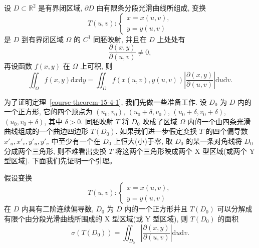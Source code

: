 \documentclass[UTF8,12pt,a4paper,fontset=fandol]{ctexart}
\begin{document}
\begin{theorem}\label{course-theorem-15-4-1}\quad 设 $D\subset\mathbb R^2$ 是有界闭区域, $\partial D$ 由有限条分段光滑曲线所组成, 变换
\[
  T(u,v):
  \begin{cases}
    x=x(u,v),\\
    y=y(u,v)
  \end{cases}
\]
是 $D$ 到有界闭区域 $\Omega$ 的 $C^1$ 同胚映射, 并且在 $D$ 上处处有
\[
  \frac{\partial(x,y)}{\partial(u,v)}\ne0,
\]
再设函数 $f(x,y)$ 在 $\Omega$ 上可积, 则
\[
  \iint_\Omega f(x,y)\mathrm dx\mathrm dy
  =\iint_D f(x(u,v),y(u,v))
  \left|\frac{\partial(x,y)}{\partial(u,v)}\right|\mathrm du\mathrm dv.
\]

为了证明定理~\ref{course-theorem-15-4-1}, 我们先做一些准备工作. 设 $D_0$ 为 $D$ 内的一个正方形, 它的四个顶点为 $(u_0,v_0)$, $(u_0+\delta,v_0)$, $(u_0+\delta,v_0+\delta)$, $(u_0,v_0+\delta)$, 其中 $\delta>0$. 同胚映射 $T$ 将 $D_0$ 映成了区域 $\Omega$ 内的一个由四条光滑曲线组成的一个曲边四边形 $T(D_0)$. 如果我们进一步假定变换 $T$ 的四个偏导数 $x'_u,x'_v,y'_u,y'_v$ 中至少有一个在 $D_0$ 上恒大(小)于零, 取 $D_0$ 的某一条对角线将 $D_0$ 分成两个三角形, 则不难看出变换 $T$ 将这两个三角形映成两个 X 型区域(或两个 Y 型区域). 下面我们先证明一个引理。

\end{theorem}
\begin{lemma}\label{course-lemma-15-4-2}\quad 假设变换
\[
  T(u,v):
  \begin{cases}
    x=x(u,v),\\
    y=y(u,v)
  \end{cases}
\]
在 $D$ 内具有二阶连续偏导数, $D_0$ 为 $D$ 内的一个正方形并且 $T(D_0)$ 可以分解成有限个由分段光滑曲线所围成的 X 型区域(或 Y 型区域), 则 $T(D_0)$ 的面积
\[
  \sigma(T(D_0))=\iint_{D_0}\left|\frac{\partial(x,y)}{\partial(u,v)}\right|\mathrm du\mathrm dv.
\]

\end{lemma}
\end{document}
